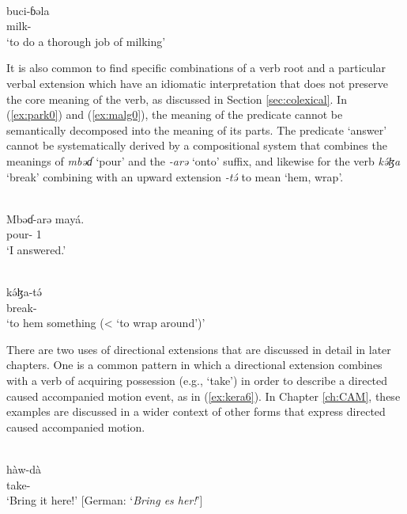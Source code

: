 \ea\label{ex:bura0}
 \\
\gll buci-ɓəla	\\
milk-		\\
\glt `to do a thorough job of milking'
\z 

It is also common to find specific combinations of a verb root and a particular verbal extension which have an idiomatic interpretation that does not preserve the core meaning of the verb, as discussed in Section \ref{sec:colexical}. In (\ref{ex:park0}) and (\ref{ex:malg0}), the meaning of the predicate cannot be semantically decomposed into the meaning of its parts. The predicate `answer' cannot be systematically derived by a compositional system that combines the meanings of \textit{mbəɗ} `pour' and the \textit{-arə} `onto' suffix, and likewise for the verb \textit{kə́ɮa} `break' combining with an upward extension \textit{-tə́} to mean `hem, wrap'.

\ea\label{ex:park0}
 \\
\gll Mbəɗ-arə mayá.	\\
pour- 1		\\
\glt `I answered.'

\ex\label{ex:malg0}
 \\
\gll kə́ɮa-tə́	\\
break-		\\
\glt `to hem something (< `to wrap around')'
\z

There are two uses of directional extensions that are discussed in detail in later chapters. One is a common pattern in which a directional extension combines with a verb of acquiring possession (e.g., `take') in order to describe a directed caused accompanied motion event, as in (\ref{ex:kera6}). In Chapter \ref{ch:CAM}, these examples are discussed in a wider context of other forms that express directed caused accompanied motion.

\ea\label{ex:kera6}
 \\
\gll hàw-dà 	\\
take-	\\
\glt `Bring it here!' [German: `\textit{Bring es her!}']
\z 


